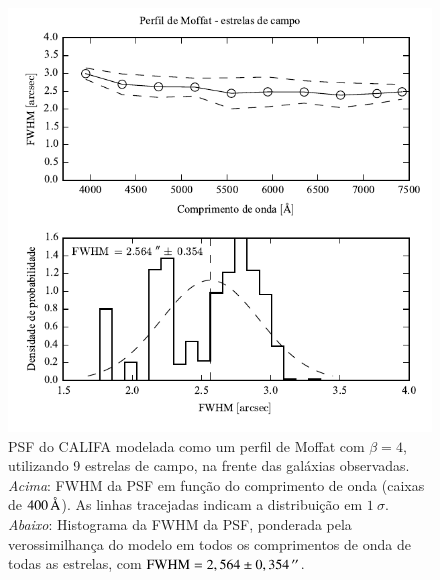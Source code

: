 \begin{figure}
	\includegraphics{figuras/PSFMoffatBeta4_field}
	\caption[PSF do CALIFA -- estrelas de campo]
	{PSF do CALIFA modelada como um perfil de Moffat com $\beta=4$, utilizando 9
	estrelas de campo, na frente das galáxias observadas. {\em Acima}: FWHM da PSF
	em função do comprimento de onda (caixas de $400\,\text{\normalfont\AA}$). As linhas
	tracejadas indicam a distribuição em $1\ \sigma$. {\em Abaixo}: Histograma da
	FWHM da PSF, ponderada pela verossimilhança do modelo em todos os comprimentos
	de onda de todas as estrelas, com $\mathrm{FWHM}=2,564 \pm 0,354\,^{\prime\prime}$.}
	\label{fig:PSFField}
\end{figure}

